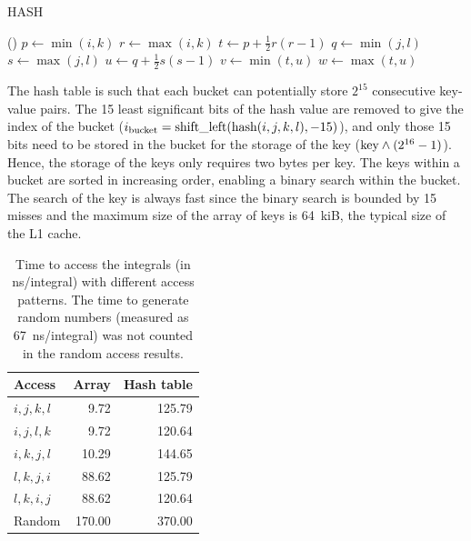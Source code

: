 \documentclass[./thesis.tex]{subfiles}
\begin{document}
\begin{algorithm}
 \caption{HASH}
 \label{alg:hash}
\Fn(){}{
        $p \gets \min (i,k)$ \;
        $r \gets \max (i,k)$ \;
        $t \gets p + \frac{1}{2} r (r-1)$ \;
        $q \gets \min (j,l)$ \;
        $s \gets \max (j,l)$ \;
        $u \gets q + \frac{1}{2} s (s-1)$ \;
        $v \gets \min (t,u)$ \;
        $w \gets \max (t,u)$ \;
         \;
}
\end{algorithm}

The hash table is such that each bucket can potentially store $2^{15}$
consecutive key-value pairs. The 15 least significant bits of the hash value
are removed to give the index of the bucket ($i_\text{bucket} =
\text{shift\_left}(\text{hash}(i,j,k,l),-15)$), and only those 15 bits need to be
stored in the bucket for the storage of the key ($\text{key} \wedge (2^{16}-1)$).
Hence, the storage of the keys only requires two bytes per key.
The keys within a bucket are sorted in increasing order, enabling a binary
search within the bucket. The search of the key is always fast
since the binary search is bounded by 15 misses and the maximum size of the
array of keys is 64~kiB, the typical size of the L1 cache.

\begin{table}
\caption{Time to access the integrals (in ns/integral) with different access patterns. The time to generate random numbers (measured as 67~ns/integral) was not counted in the random access results.}
\begin{center}
  \begin{tabular}{lrr}
    \hline
   Access  & Array  & Hash table  \\ 
\hline
 $i,j,k,l$ &  9.72  &  125.79     \\ 
 $i,j,l,k$ &  9.72  &  120.64     \\ 
 $i,k,j,l$ & 10.29  &  144.65     \\ 
 $l,k,j,i$ & 88.62  &  125.79     \\ 
 $l,k,i,j$ & 88.62  &  120.64     \\ 
   Random  & 170.00 &  370.00     \\ 
    \hline
  \end{tabular}
\end{center}
\end{table}
\end{document}
